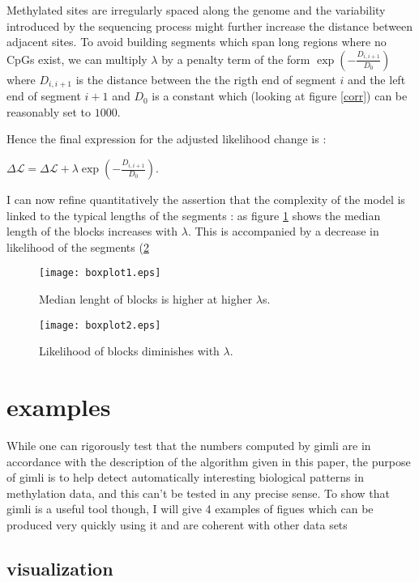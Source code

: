 \documentclass[11pt]{amsart}
\newcommand{\lik}{\ensuremath{\mathcal{L}}}
\begin{document}
Methylated sites are irregularly spaced along the genome and the variability 
introduced by the sequencing process might further increase the distance 
between adjacent sites.
To avoid building segments which span long regions where no CpGs exist, we 
can multiply $\lambda$ by a penalty term of the
form $\exp(-\frac{D_{i,i+1}}{D_0})$ where $D_{i,i+1}$ is the distance 
between the the rigth end of segment $i$ and the left end of segment $i+1$ and 
$D_0$ is a constant which (looking at figure \ref{corr}) can be reasonably 
set to $1000$. 

Hence the final expression for the adjusted likelihood change is :

$\Delta \lik = \Delta \lik+\lambda \exp(-\frac{D_{i,i+1}}{D_0}) $.

I can now refine quantitatively the assertion that the complexity of the model
is linked to the typical lengths of the segments : as figure \ref{boxplot1} 
shows the median length of the blocks increases with $\lambda$. This is 
accompanied by a decrease in likelihood of the segments (\ref{boxplot2}

\begin{figure}\label{boxplot1}
\texttt{[image: boxplot1.eps]}
\caption{Median lenght of blocks is higher at higher $\lambda$s.}
\end{figure}

\begin{figure}\label{boxplot2}
\texttt{[image: boxplot2.eps]}
\caption{Likelihood of blocks diminishes with $\lambda$.}
\end{figure}


\section{examples}

While one can rigorously test that the numbers computed by gimli are in 
accordance with the description
of the algorithm given in this paper, the purpose of gimli is to help 
detect automatically interesting
biological patterns in methylation data, and this can't be tested in any 
precise sense. To show that gimli is a useful tool
though, I will give 4 examples of figues which can be produced very quickly
using it and are coherent with other data sets

\subsection{visualization}
\end{document}
